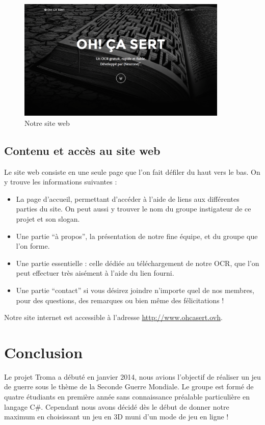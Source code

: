 \documentclass[11pt]{report}
\begin{document}
\begin{figure}[htbp]
\centering
\includegraphics[width=10cm]{www.png}
\caption{Notre site web}
\end{figure}

\section{Contenu et accès au site web}

Le site web consiste en une seule page que l'on fait défiler du haut vers le bas. On y trouve les informations suivantes :

\begin{itemize}
\item La page d’accueil, permettant d'accéder à l'aide de liens aux différentes parties du site. On peut aussi y trouver le nom du groupe instigateur de ce projet et son slogan.
\item Une partie ``à propos'',  la présentation de notre fine équipe, et du groupe que l'on forme.
\item Une partie essentielle : celle dédiée au téléchargement de notre OCR, que l'on peut effectuer très aisément à l'aide du lien fourni.
\item Une partie ``contact'' si vous désirez joindre n'importe quel de nos membres, pour des questions, des remarques ou bien même des félicitations !
\end{itemize}

Notre site internet est accessible à l'adresse \url{http://www.ohcasert.ovh}.

\chapter{Conclusion}

Le projet Troma a débuté en janvier 2014, nous avions l'objectif de réaliser un jeu de guerre sous le thème de la Seconde Guerre Mondiale. Le groupe est formé de quatre étudiants en première année sans connaissance préalable particulière en langage C\#. Cependant nous avons décidé dès le début de donner notre maximum en choisissant un jeu en 3D muni d'un mode de jeu en ligne ! 
\end{document}
